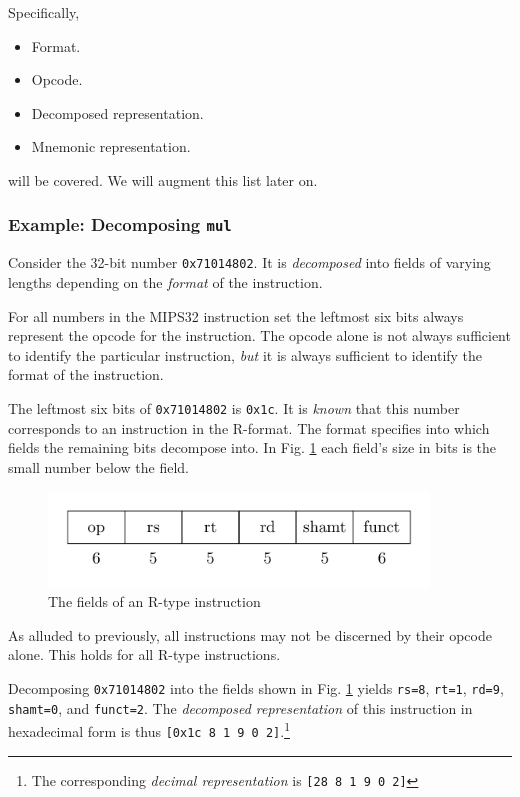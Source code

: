 \documentclass[a4paper]{article}
\begin{document}
Specifically,

\begin{itemize}
  \item Format.
  \item Opcode.
  \item Decomposed representation.
  \item Mnemonic representation.
\end{itemize}

will be covered. We will augment this list later on.
\subsubsection{Example: Decomposing \texttt{mul}}\label{section:mul-example}

Consider the 32-bit number \texttt{0x71014802}. It is \emph{decomposed}
into fields of varying lengths depending on the \emph{format} of the
instruction.

For all numbers in the MIPS32 instruction set the leftmost six bits
always represent the opcode for the instruction. The opcode alone is
not always sufficient to identify the particular instruction,
\emph{but} it is always sufficient to identify the format of the
instruction.

The leftmost six bits of \texttt{0x71014802} is \texttt{0x1c}. It is
\emph{known} that this number corresponds to an instruction in the
R-format. The format specifies into which fields the remaining bits
decompose into. In Fig. \ref{fig:r-decomposed} each field's size in
bits is the small number below the field.

\begin{figure}[H]
  \centering
  \includegraphics[width=0.9\textwidth]{figures/r-decomposed.png}
  \caption{The fields of an R-type instruction}
  \label{fig:r-decomposed}
\end{figure}

As alluded to previously, all instructions may not be discerned by
their opcode alone. This holds for all R-type instructions.

Decomposing \texttt{0x71014802} into the fields shown in
Fig. \ref{fig:r-decomposed} yields \texttt{rs=8}, \texttt{rt=1},
\texttt{rd=9}, \texttt{shamt=0}, and \texttt{funct=2}. The
\emph{decomposed representation} of this instruction in hexadecimal
form is thus \texttt{[0x1c 8 1 9 0 2]}.\footnote{The corresponding
\emph{decimal representation} is \texttt{[28 8 1 9 0 2]}}
\end{document}
